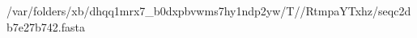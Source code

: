 \documentclass[10pt]{article}
\begin{document}
\begin{texshade}{/var/folders/xb/dhqq1mrx7_b0dxpbvwms7hy1ndp2yw/T//RtmpaYTxhz/seqc2db7e27b742.fasta}
\hideconsensus
{}
\hidelogoscale
{}
\showlegend
\end{texshade}
\end{document}
